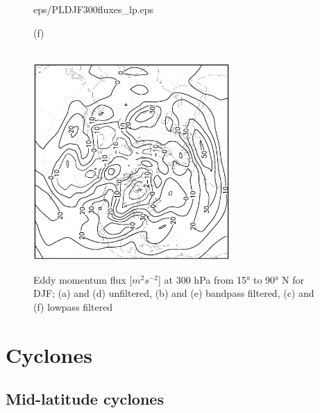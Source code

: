 \documentclass[12pt,a4paper,twoside,openright,headinclude,liststotoc,bibtotoc]{scrreprt}
\begin{document}
\begin{figure}[c]
{{eps/PLDJF300fluxes_lp.eps}
}
\parbox{8.5cm}{\hspace{0.95cm}\begin{scriptsize}(f)\end{scriptsize} \vspace{-0.2cm} \\
\includegraphics[height=7.5cm,angle=-90]
{eps/ERADJF300fluxes_lp.eps}
}
\caption[Eddy momentum flux at 300 hPa for DJF]{Eddy momentum flux [$m^{2}s^{-2}$] at 300 hPa from 15° to 90° N for DJF; (a) and (d) unfiltered, (b) and (e) bandpass filtered, (c) and (f) lowpass filtered}
\label{img:uvDJF}
\end{figure}

\vspace{-0.4cm}
\chapter{Cyclones}
\vspace{-0.4cm}
\section{Mid-latitude cyclones}
\vspace{-0.4cm}
\end{document}
